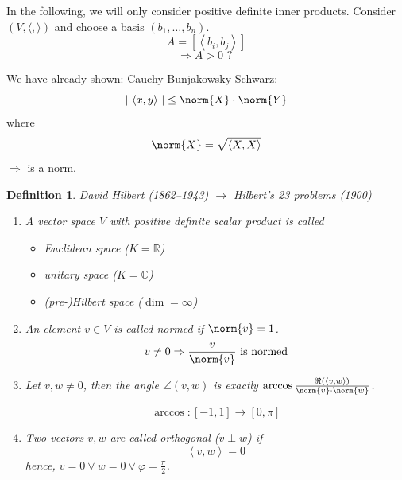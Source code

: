 \documentclass[a4paper,landscape,twocolumn]{article}
\newcommand\abs[1]{|\,#1\,|}
\newcommand\functional[1]{\left\langle{#1}\right\rangle}
\newtheorem{defi}{Definition}
\DeclarePairedDelimiter\norm\lVert\rVert
\begin{document}
In the following, we will only consider positive definite inner products.
Consider $(V, \langle, \rangle)$ and choose a basis $(b_1, \ldots, b_n)$.
\[ A = [\functional{b_i, b_j}] \]
\[ \Rightarrow A > 0 \text{ ? } \]

We have already shown: Cauchy-Bunjakowsky-Schwarz:
\[ \abs{\functional{x,y}} \leq \norm{X} \cdot \norm{Y} \]
where
\[ \norm{X} = \sqrt{\functional{X,X}} \]
$\Rightarrow$ is a norm.

\begin{defi}
  \label{defi-8.33}
  David Hilbert (1862--1943) $\rightarrow$ Hilbert's 23 problems (1900)

  \begin{enumerate}
    \item
      A vector space $V$ with positive definite scalar product is called
      \begin{itemize}
        \item Euclidean space ($K = \mathbb R$)
        \item unitary space ($K = \mathbb C$)
        \item (pre-)Hilbert space ($\dim = \infty$)
      \end{itemize}

    \item
      An element $v \in V$ is called \emph{normed} if $\norm{v} = 1$.
      \[ v \neq 0 \Rightarrow \frac{v}{\norm{v}} \text{ is normed} \]

    \item
      Let $v, w \neq 0$, then the angle $\angle(v, w)$ is exactly
      $\arccos{\frac{\Re(\functional{v,w})}{\norm{v} \cdot \norm{w}}}$.

      \[ \arccos: [-1,1] \to [0,\pi] \]

    \item
      Two vectors $v,w$ are called \emph{orthogonal} ($v \perp w$) if
      \[ \functional{v,w} = 0 \]
      hence, $v = 0 \lor w = 0 \lor \varphi = \frac{\pi}{2}$.
  \end{enumerate}
\end{defi}
\end{document}
